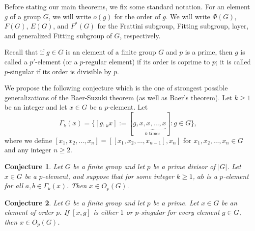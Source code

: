 \newcommand{\geqs}{\geqslant}
\renewcommand{\geq}{\geqs}
\newtheorem{conjecture}{Conjecture}

Before stating our main theorems, we fix some standard notation. For an element $g$ of a group $G$, we will write $o(g)$ for the order of $g$. We will write $\Phi(G)$, $F(G)$, $E(G)$, and $F^*(G)$ for the Frattini subgroup, Fitting subgroup, layer, and generalized Fitting subgroup of $G$, respectively.

Recall that if $g\in G$ is an element of a finite group $G$ and $p$ is a prime, then  $g$ is called a $p'$-element (or a $p$-regular element) if its order is coprime to $p$; it is called $p$-singular if its order is divisible by $p$.

We propose the following conjecture which is the one of strongest possible generalizations of the Baer-Suzuki theorem (as well
as Baer's theorem). Let  $k\ge 1$ be an integer and let $x\in G$ be a $p$-element.  Let $$\Gamma_k(x)=\{[g,{}_kx]:= [g,\underbrace{x,x,\dots, x}_{k \text{ times}}]: g\in G\},$$
where we define $[x_1,x_2,\dots,x_n]=[[x_1,x_2,\dots,x_{n-1}],x_n]$ for  $x_1,x_2,\dots,x_n\in G$ and any integer $n\ge 2$.
\begin{conjecture}\label{conj: multicommutators}
Let $G$ be a finite group and let $p$ be a prime divisor of $|G|$. Let $x\in G$ be a $p$-element, and suppose that for some integer $k\geq 1$, $ab$ is a $p$-element for all $a,b\in \Gamma_k(x)$. Then $x\in O_p(G)$.
\end{conjecture}

\begin{conjecture}\label{conjD}
Let $G$ be a finite group and let $p$ be a prime. Let $x\in G$ be an element of order $p$.   If $[x,g]$ is either $1$ or $p$-singular for every element $g\in G$, then $x\in O_p(G)$.
\end{conjecture}
